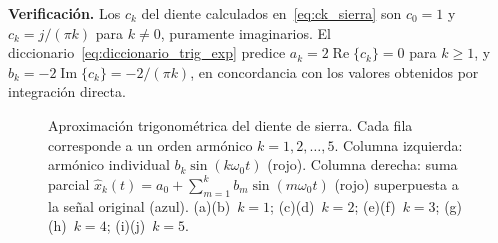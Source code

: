 \documentclass[class=book, crop=false]{standalone}
\begin{document}
\textbf{Verificación.} Los $c_k$ del diente calculados
en~\eqref{eq:ck_sierra} son $c_0 = 1$ y $c_k = j/(\pi k)$ para
$k\neq 0$, puramente imaginarios. El
diccionario~\eqref{eq:diccionario_trig_exp} predice
$a_k = 2\operatorname{Re}\{c_k\} = 0$ para $k\geq 1$, y
$b_k = -2\operatorname{Im}\{c_k\} = -2/(\pi k)$, en concordancia con
los valores obtenidos por integración directa.

\begin{figure}[H]
    \centering
    \begin{minipage}{\linewidth}
        \centering
        
        \caption{Aproximación trigonométrica del diente de sierra.
                 Cada fila corresponde a un orden armónico
                 $k = 1, 2, \dots, 5$. Columna izquierda: armónico
                 individual $b_k\sin(k\omega_0 t)$ (rojo). Columna
                 derecha: suma parcial $\hat x_k(t) = a_0 +
                 \sum_{m=1}^{k} b_m\sin(m\omega_0 t)$ (rojo)
                 superpuesta a la señal original (azul).
                 (a)(b)~$k=1$; (c)(d)~$k=2$; (e)(f)~$k=3$;
                 (g)(h)~$k=4$; (i)(j)~$k=5$.}
        \label{fig:aprox_trig_sierra}
    \end{minipage}
\end{figure}
\end{document}
